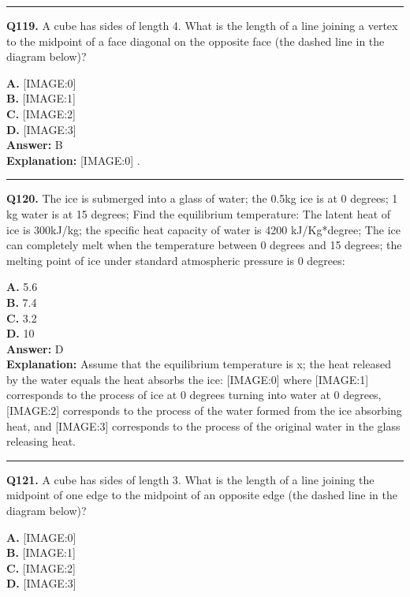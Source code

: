 \documentclass[12pt]{article}
\begin{document}
\hrule
\vspace{1em}


\noindent
\textbf{Q119.} A cube has sides of length 4. What is the length of a line joining a vertex to the midpoint of a face diagonal on the opposite face (the dashed line in the diagram below)?



\textbf{A.} [IMAGE:0] \\
\textbf{B.} [IMAGE:1] \\
\textbf{C.} [IMAGE:2] \\
\textbf{D.} [IMAGE:3] \\

\textbf{Answer:} B \\
\textbf{Explanation:} [IMAGE:0]
.

\hrule
\vspace{1em}


\noindent
\textbf{Q120.} The ice is submerged into a glass of water; the 0.5kg ice is at 0 degrees; 1 kg water is at 15 degrees; Find the equilibrium temperature: The latent heat of ice is 300kJ/kg; the specific heat capacity of water is 4200 kJ/Kg*degree; The ice can completely melt when the temperature between 0 degrees and 15 degrees; the melting point of ice under standard atmospheric pressure is 0 degrees:



\textbf{A.} 5.6 \\
\textbf{B.} 7.4 \\
\textbf{C.} 3.2 \\
\textbf{D.} 10 \\

\textbf{Answer:} D \\
\textbf{Explanation:} Assume that the equilibrium temperature is x; the heat released by the water equals the heat absorbs the ice:
[IMAGE:0]
where
[IMAGE:1]
corresponds to the process of ice at 0 degrees turning into water at 0 degrees,
[IMAGE:2]
corresponds to the process of the water formed from the ice absorbing heat, and
[IMAGE:3]
corresponds to the process of the original water in the glass releasing heat.

\hrule
\vspace{1em}


\noindent
\textbf{Q121.} A cube has sides of length 3. What is the length of a line joining the midpoint of one edge to the midpoint of an opposite edge (the dashed line in the diagram below)?



\textbf{A.} [IMAGE:0] \\
\textbf{B.} [IMAGE:1] \\
\textbf{C.} [IMAGE:2] \\
\textbf{D.} [IMAGE:3] \\
\end{document}
